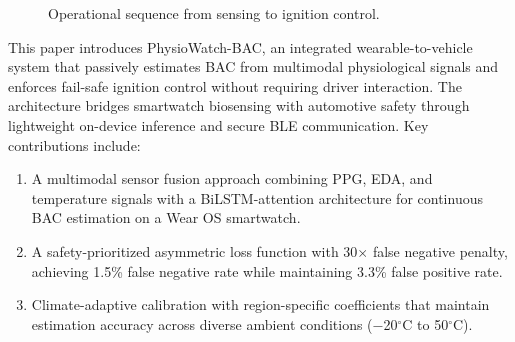 \documentclass[HARVARD,Times2COL]{WileyNJDv5} %
\providecommand{\DIFadd}[1]{{\protect\color{red} #1}} %
\providecommand{\DIFaddbegin}{} %
\providecommand{\DIFaddend}{} %
\providecommand{\DIFdelbegin}{} %
\providecommand{\DIFdelend}{} %
\providecommand{\DIFscaledelfig}{0.5}
\newlength{\DIFdelgraphicswidth} %
\newlength{\DIFdelgraphicsheight} %
\providecommand{\DIFaddincludegraphics}[2][]{{\color{blue}\fbox{\DIFOincludegraphics[#1]{#2}}}} %
\providecommand{\DIFdelincludegraphics}[2][]{%
\sbox{\DIFdelgraphicsbox}{\DIFOincludegraphics[#1]{#2}}%
\settoboxwidth{\DIFdelgraphicswidth}{\DIFdelgraphicsbox} %
\settoboxtotalheight{\DIFdelgraphicsheight}{\DIFdelgraphicsbox} %
\scalebox{\DIFscaledelfig}{%
\parbox[b]{\DIFdelgraphicswidth}{\usebox{\DIFdelgraphicsbox}\\[-\baselineskip] \rule{\DIFdelgraphicswidth}{0em}}\llap{\resizebox{\DIFdelgraphicswidth}{\DIFdelgraphicsheight}{%
\setlength{\unitlength}{\DIFdelgraphicswidth}%
\begin{picture}(1,1)%
\thicklines\linethickness{2pt} %
{\color[rgb]{1,0,0}\put(0,0){\framebox(1,1){}}}%
{\color[rgb]{1,0,0}\put(0,0){\line( 1,1){1}}}%
{\color[rgb]{1,0,0}\put(0,1){\line(1,-1){1}}}%
\end{picture}%
}\hspace*{3pt}}} %
} %
\DeclareRobustCommand{\DIFaddbegin}{\DIFOaddbegin \let\includegraphics\DIFaddincludegraphics} %
\DeclareRobustCommand{\DIFaddend}{\DIFOaddend \let\includegraphics\DIFOincludegraphics} %
\DeclareRobustCommand{\DIFdelbegin}{\DIFOdelbegin \let\includegraphics\DIFdelincludegraphics} %
\DeclareRobustCommand{\DIFdelend}{\DIFOaddend \let\includegraphics\DIFOincludegraphics} %
\begin{document}
\begin{figure}[t]
\centering

\caption{Operational sequence from sensing to ignition control.}
\label{fig:sequence}
\end{figure}
\DIFdelbegin %
\DIFdelend \DIFaddbegin \DIFadd{This paper introduces PhysioWatch-BAC, an integrated wearable-to-vehicle system that passively estimates BAC from multimodal physiological signals and enforces fail-safe ignition control without requiring driver interaction. The architecture bridges smartwatch biosensing with automotive safety through lightweight on-device inference and secure BLE communication. Key contributions include:
}\DIFaddend \begin{enumerate}
    \item \DIFdelbegin %
\DIFdelend \DIFaddbegin \DIFadd{A multimodal sensor fusion approach combining PPG, EDA, and temperature signals with a BiLSTM-attention architecture for continuous BAC estimation on a Wear OS smartwatch.
    }\DIFaddend \item \DIFdelbegin %
\DIFdelend \DIFaddbegin \DIFadd{A safety-prioritized asymmetric loss function with 30$\times$ false negative penalty, achieving 1.5\% false negative rate while maintaining 3.3\% false positive rate.
    }\DIFaddend \item \DIFdelbegin %
\DIFdelend \DIFaddbegin \DIFadd{Climate-adaptive calibration with region-specific coefficients that maintain estimation accuracy across diverse ambient conditions ($-$20$^\circ$C to 50$^\circ$C).
}
\end{enumerate}
\end{document}
